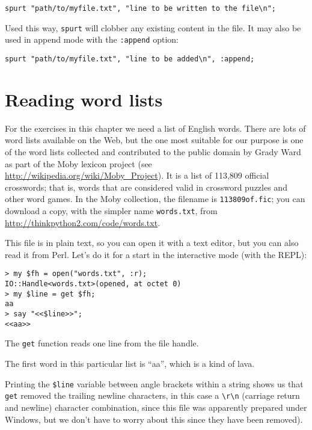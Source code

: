 \begin{verbatim}
spurt "path/to/myfile.txt", "line to be written to the file\n";
\end{verbatim}

Used this way, {\tt spurt} will clobber any existing content in 
the file. It may also be used in append mode with the {\tt :append} 
option:

\begin{verbatim}
spurt "path/to/myfile.txt", "line to be added\n", :append;
\end{verbatim}


\section{Reading word lists}
\label{wordlist}

For the exercises in this chapter we need a list of English 
words. There are lots of word lists available on the Web, 
but the one most suitable for our purpose is one of the 
word lists collected and contributed to the public domain 
by Grady Ward as part of the Moby lexicon project (see 
\url{http://wikipedia.org/wiki/Moby_Project}).  It is a 
list of 113,809 official crosswords; that is, words that are
considered valid in crossword puzzles and other word games.  
In the Moby collection, the filename is {\tt 113809of.fic}; 
you can download a copy, with the simpler name {\tt words.txt}, 
from \url{http://thinkpython2.com/code/words.txt}.

This file is in plain text, so you can open it with a text
editor, but you can also read it from Perl. Let's do it for 
a start in the interactive mode (with the REPL):

\begin{verbatim}
> my $fh = open("words.txt", :r);
IO::Handle<words.txt>(opened, at octet 0)
> my $line = get $fh;
aa
> say "<<$line>>";
<<aa>>
\end{verbatim}

The {\tt get} function reads one line from the file handle. 

The first word in this particular list is ``aa'', which is 
a kind of lava. 

Printing the \verb'$line' variable between angle brackets 
within a string shows us that {\tt get} removed the trailing 
newline characters, in this case a \verb'\r\n' (carriage 
return and newline) character combination, since this file was 
apparently prepared under Windows, but we don't have to 
worry about this since they have been removed).

